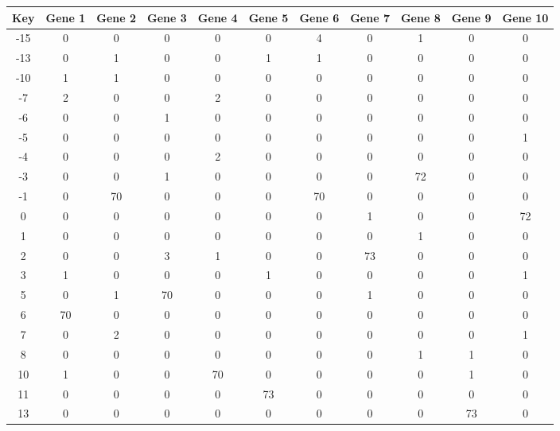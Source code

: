 \begin{tabular}{|c|c|c|c|c|c|c|c|c|c|c|}
\hline
Key & Gene 1 & Gene 2 & Gene 3 & Gene 4 & Gene 5 & Gene 6 & Gene 7 & Gene 8 & Gene 9 & Gene 10 \\
\hline
-15 & 0 & 0 & 0 & 0 & 0 & 4 & 0 & 1 & 0 & 0 \\
-13 & 0 & 1 & 0 & 0 & 1 & 1 & 0 & 0 & 0 & 0 \\
-10 & 1 & 1 & 0 & 0 & 0 & 0 & 0 & 0 & 0 & 0 \\
-7 & 2 & 0 & 0 & 2 & 0 & 0 & 0 & 0 & 0 & 0 \\
-6 & 0 & 0 & 1 & 0 & 0 & 0 & 0 & 0 & 0 & 0 \\
-5 & 0 & 0 & 0 & 0 & 0 & 0 & 0 & 0 & 0 & 1 \\
-4 & 0 & 0 & 0 & 2 & 0 & 0 & 0 & 0 & 0 & 0 \\
-3 & 0 & 0 & 1 & 0 & 0 & 0 & 0 & 72 & 0 & 0 \\
-1 & 0 & 70 & 0 & 0 & 0 & 70 & 0 & 0 & 0 & 0 \\
0 & 0 & 0 & 0 & 0 & 0 & 0 & 1 & 0 & 0 & 72 \\
1 & 0 & 0 & 0 & 0 & 0 & 0 & 0 & 1 & 0 & 0 \\
2 & 0 & 0 & 3 & 1 & 0 & 0 & 73 & 0 & 0 & 0 \\
3 & 1 & 0 & 0 & 0 & 1 & 0 & 0 & 0 & 0 & 1 \\
5 & 0 & 1 & 70 & 0 & 0 & 0 & 1 & 0 & 0 & 0 \\
6 & 70 & 0 & 0 & 0 & 0 & 0 & 0 & 0 & 0 & 0 \\
7 & 0 & 2 & 0 & 0 & 0 & 0 & 0 & 0 & 0 & 1 \\
8 & 0 & 0 & 0 & 0 & 0 & 0 & 0 & 1 & 1 & 0 \\
10 & 1 & 0 & 0 & 70 & 0 & 0 & 0 & 0 & 1 & 0 \\
11 & 0 & 0 & 0 & 0 & 73 & 0 & 0 & 0 & 0 & 0 \\
13 & 0 & 0 & 0 & 0 & 0 & 0 & 0 & 0 & 73 & 0 \\
\hline
\end{tabular}